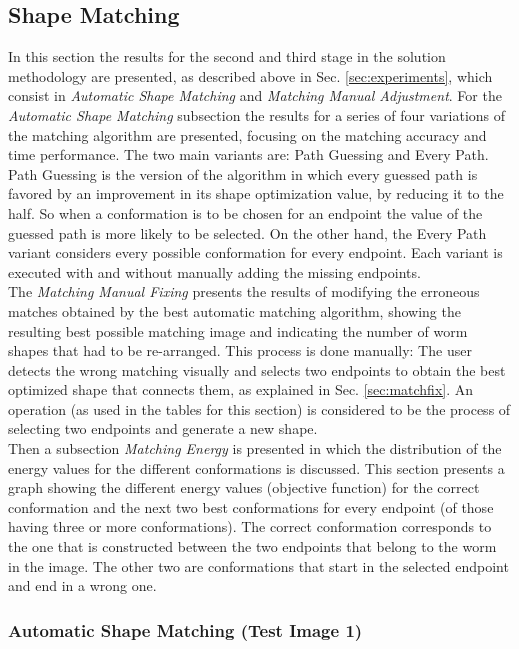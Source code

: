 \subsection{Shape Matching}

In this section the results for the second and third stage in the 
solution methodology are presented, as described above in Sec. \ref{sec:experiments}, which consist
in \emph{Automatic Shape Matching} and \emph{Matching Manual Adjustment}. 
For the \emph{Automatic Shape Matching} subsection the results for a series of four 
variations of the matching algorithm are presented, focusing on the matching accuracy 
and time performance. The two main variants are: Path Guessing and Every Path. 
Path Guessing is the version of the algorithm in which every guessed path is favored
by an improvement in its shape optimization value, by reducing it to the half. So when 
a conformation is to be chosen for an endpoint the value of the guessed path is more likely
to be selected. On the other hand, the Every Path variant considers every possible conformation for every endpoint.
Each variant is executed with and without manually adding the missing endpoints.\\

The \emph{Matching Manual Fixing} presents the results of modifying the erroneous matches
obtained by the best automatic matching algorithm, showing the resulting best
possible matching image and indicating the number of worm shapes that had to be 
re-arranged. This process is done manually: The user detects the wrong matching visually 
and selects two endpoints to obtain the best optimized shape that connects them, as
explained in Sec. \ref{sec:matchfix}. An operation (as used in the tables for this section) 
is considered to be the process of selecting two endpoints and generate a new shape.\\

Then a subsection \emph{Matching Energy} is presented in which the distribution of
the energy values for the different conformations is discussed. This section presents
a graph showing the different energy values (objective function) for the correct conformation
and the next two best conformations for every endpoint (of those having three or more conformations). 
The correct conformation corresponds to the one that is constructed between the two endpoints that
belong to the worm in the image. The other two are conformations that start in the
selected endpoint and end in a wrong one.


\subsubsection*{Automatic Shape Matching (Test Image 1)}

